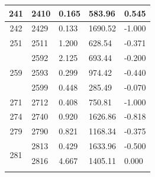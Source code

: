\documentclass[12pt,a4paper]{article}
\begin{document}
{\begin{longtable}{@{}cllll@{}}
	241                                             & 2410                                         & 0.165                           & 583.96                           & 0.545                            \\ \hline
	242                                             & 2429                                         & 0.133                           & 1690.52                          & -1.000                           \\ \hline
	251                                             & 2511                                         & 1.200                           & 628.54                           & -0.371                           \\ \hline
	\multirow{3}{*}{259}                            & 2592                                         & 2.125                           & 693.44                           & -0.200                           \\ \cline{2-5} 
	& 2593                                         & 0.299                           & 974.42                           & -0.440                           \\ \cline{2-5} 
	& 2599                                         & 0.448                           & 285.49                           & -0.070                           \\ \hline
	271                                             & 2712                                         & 0.408                           & 750.81                           & -1.000                           \\ \hline
	274                                             & 2740                                         & 0.920                           & 1626.86                          & -0.818                           \\ \hline
	279                                             & 2790                                         & 0.821                           & 1168.34                          & -0.375                           \\ \hline
	\multirow{3}{*}{281}                            & 2813                                         & 0.429                           & 1633.96                          & -0.500                           \\ \cline{2-5} 
	& 2816                                         & 4.667                           & 1405.11                          & 0.000                            \\ \cline{2-5} 

\end{longtable}}
\end{document}
